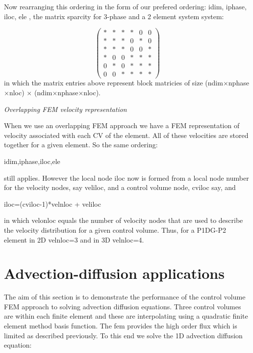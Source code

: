 Now rearranging this ordering in the form of our prefered ordering: idim, iphase, iloc, ele
, 
the matrix sparcity for 3-phase and a 2 element system system:

\begin{equation}
  \begin{pmatrix}
*  &  *  &  *      &   *   &  0  &  0  \\ 
*  &  *  &  *      &   0   &  *  &  0  \\ 
*  &  *  &  *      &   0   &  0  &  *  \\ 
%
*  &  0  &  0      &   *   &  *  &  *  \\
0  &  *  &  0      &   *   &  *  &  *  \\
0  &  0  &  *      &   *   &  *  &  *  
  \end{pmatrix}
\label{Vel-Mphase-mat-spar}
\end{equation}
in which the matrix entries above represent block matricies of size (ndim$\times$nphase$\times$nloc) 
$\times$  (ndim$\times$nphase$\times$nloc).  


\par\noindent
{\it Overlapping FEM velocity representation} 
\par\noindent
When we use an overlapping FEM approach we have a FEM representation of 
velocity associated with each CV of the element. All of these velocities are stored 
together for a given element. So the same ordering: 
\par\noindent
idim,iphase,iloc,ele

\par\noindent
still applies. However the local node iloc now is formed from 
a local node number for the velocity nodes, say veliloc, and 
a control volume node, cviloc say, and  
\par\noindent
iloc=(cviloc-1)*velnloc + veliloc

\par\noindent
in which velonloc equals the number of velocity nodes that are used 
to describe the velocity distribution for a given control volume. 
Thus, for a P1DG-P2 element in 2D velnloc=3 and in 3D velnloc=4. 


\pagebreak


\section{Advection-diffusion applications}
\label{Advection-diffusion applications} 

The aim of this section is to demonstrate the performance of the 
control volume FEM approach to solving advection diffusion equations. 
Three control volumes are within each finite element 
and these are interpolating using a quadratic finite element 
method basis function. The fem provides the high order 
flux which is limited as described previously.  
To this end we solve the 1D advection diffusion equation:

